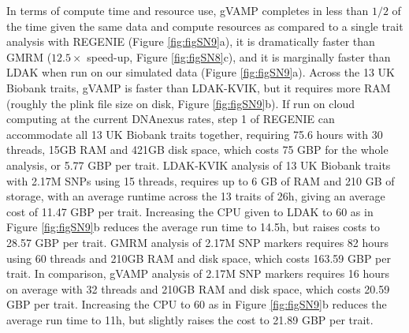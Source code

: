 In terms of compute time and resource use, gVAMP completes in less than $1/2$ of the time given the same data and compute resources as compared to a single trait analysis with REGENIE (Figure \ref{fig:figSN9}a), it is dramatically faster than GMRM ($12.5\times$ speed-up, Figure \ref{fig:figSN8}c), and it is marginally faster than LDAK when run on our simulated data (Figure \ref{fig:figSN9}a). Across the 13 UK Biobank traits, gVAMP is faster than LDAK-KVIK, but it requires more RAM (roughly the plink file size on disk, Figure \ref{fig:figSN9}b). If run on cloud computing at the current DNAnexus rates, step 1 of REGENIE can accommodate all 13 UK Biobank traits together, requiring 75.6 hours with 30 threads, 15GB RAM and 421GB disk space, which costs 75 GBP for the whole analysis, or 5.77 GBP per trait. LDAK-KVIK analysis of 13 UK Biobank traits with 2.17M SNPs using 15 threads, requires up to 6 GB of RAM and 210 GB of storage, with an average runtime across the 13 traits of 26h, giving an average cost of 11.47 GBP per trait. Increasing the CPU given to LDAK to 60 as in Figure \ref{fig:figSN9}b reduces the average run time to 14.5h, but raises costs to 28.57 GBP per trait. GMRM analysis of 2.17M SNP markers requires 82 hours using 60 threads and 210GB RAM and disk space, which costs 163.59 GBP per trait. In comparison, gVAMP analysis of 2.17M SNP markers requires 16 hours on average with 32 threads and 210GB RAM and disk space, which costs 20.59 GBP per trait. Increasing the CPU to 60 as in Figure \ref{fig:figSN9}b reduces the average run time to 11h, but slightly raises the cost to 21.89 GBP per trait.

